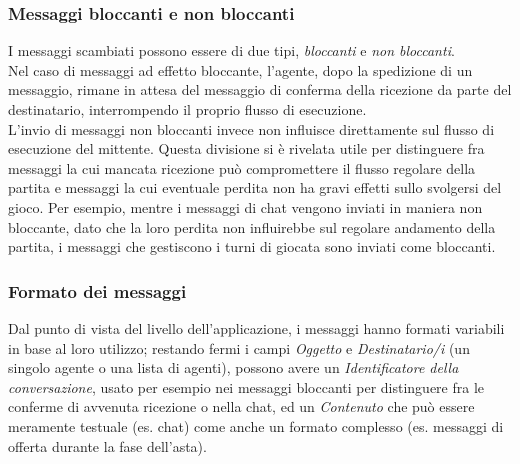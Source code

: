\subsubsection*{Messaggi bloccanti e non bloccanti}

I messaggi scambiati possono essere di due tipi, \emph{bloccanti} e \emph{non bloccanti}.\\
Nel caso di messaggi ad effetto bloccante, l'agente, dopo la spedizione di un messaggio, rimane in attesa del messaggio di conferma della ricezione da parte del destinatario, interrompendo il proprio flusso di esecuzione.\\
L'invio di messaggi non bloccanti invece non influisce direttamente sul flusso di esecuzione del mittente.
Questa divisione si è rivelata utile per distinguere fra messaggi la cui mancata ricezione può compromettere il flusso regolare della partita e messaggi la cui eventuale perdita non ha gravi effetti sullo svolgersi del gioco. Per esempio, mentre i messaggi di chat vengono inviati in maniera non bloccante, dato che la loro perdita non influirebbe sul regolare andamento della partita, i messaggi che gestiscono i turni di giocata sono inviati come bloccanti.


\subsubsection*{Formato dei messaggi}
Dal punto di vista del livello dell'applicazione, i messaggi hanno formati variabili in base al loro utilizzo; restando fermi i campi \emph{Oggetto} e \emph{Destinatario/i} (un singolo agente o una lista di agenti), possono avere un \emph{Identificatore della conversazione}, usato per esempio nei messaggi bloccanti per distinguere fra le conferme di avvenuta ricezione o nella chat, ed un \emph{Contenuto} che può essere meramente testuale (es. chat) come anche un formato complesso (es. messaggi di offerta durante la fase dell'asta).
